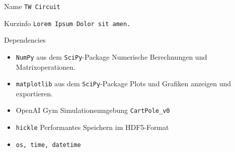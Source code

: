 \begin{minipage}[b]{0.62\textwidth}
	\begin{mybox}{Name}
		\texttt{TW Circuit}
	\end{mybox}
	\begin{mybox}{Kurzinfo}
		\texttt{Lorem Ipsum Dolor sit amen.}
	\end{mybox}
	\begin{mybox}{Dependencies}
		\begin{itemize}
			\item \texttt{NumPy} aus dem \texttt{SciPy}-Package
			\subitem Numerische Berechnungen und Matrixoperationen.
			\item \texttt{matplotlib} aus dem \texttt{SciPy}-Package
			\subitem Plots und Grafiken anzeigen und exportieren.
			\item OpenAI Gym
			\subitem Simulationsumgebung \texttt{CartPole\_v0}
			\item \texttt{hickle}
			\subitem Performantes Speichern im HDF5-Format
			\item \texttt{os, time, datetime}
		\end{itemize}
	\end{mybox}
\end{minipage}
\hfill
